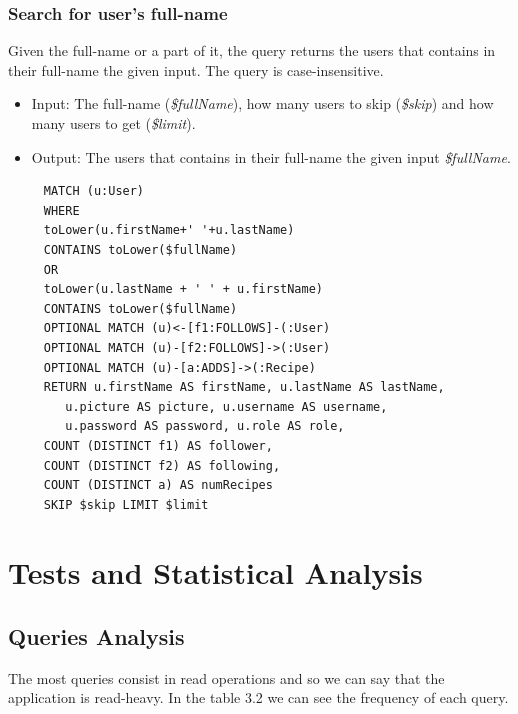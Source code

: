 \documentclass[a4paper]{report}
\begin{document}
\subsubsection{Search for user's full-name}
Given the full-name or a part of it, the query returns the users that contains in their full-name the given input. The query is case-insensitive.
\begin{itemize}
	\item Input: The full-name (\emph{\$fullName}), how many users to skip (\emph{\$skip}) and how many users to get (\emph{\$limit}).
	\item Output: The users that contains in their full-name the given input \emph{\$fullName}.
\end{itemize}
\begin{lstlisting}
	 MATCH (u:User) 
	 WHERE
	 toLower(u.firstName+' '+u.lastName)
	 CONTAINS toLower($fullName)
	 OR
	 toLower(u.lastName + ' ' + u.firstName)
	 CONTAINS toLower($fullName)
	 OPTIONAL MATCH (u)<-[f1:FOLLOWS]-(:User)
	 OPTIONAL MATCH (u)-[f2:FOLLOWS]->(:User)
	 OPTIONAL MATCH (u)-[a:ADDS]->(:Recipe)
	 RETURN u.firstName AS firstName, u.lastName AS lastName,
	 	u.picture AS picture, u.username AS username,
	 	u.password AS password, u.role AS role,
	 COUNT (DISTINCT f1) AS follower,
	 COUNT (DISTINCT f2) AS following,
	 COUNT (DISTINCT a) AS numRecipes
	 SKIP $skip LIMIT $limit
\end{lstlisting} 

\section{Tests and Statistical Analysis}
\subsection{Queries Analysis}
The most queries consist in read operations and so we can say that the application is read-heavy. In the table 3.2 we can see the frequency of each query. 
\end{document}
